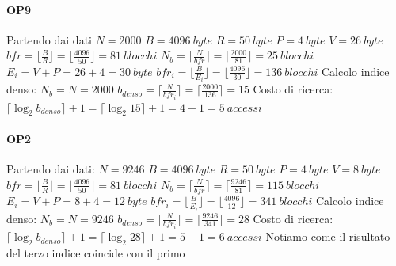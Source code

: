 \paragraph{OP9} Partendo dai dati
\newline
$N = 2000$
\newline
$B = 4096\ byte$
\newline
$R = 50\ byte$
\newline
$P = 4\ byte$
\newline
$V = 26\ byte$
\newline
\newline
$bfr = \lfloor \frac{B}{R} \rfloor = \lfloor \frac{4096}{50} \rfloor = 81 \ blocchi$
\newline
$N_b = \lceil \frac{N}{bfr} \rceil = \lceil \frac{2000}{81} \rceil = 25\ blocchi$
\newline
$E_i = V + P = 26 + 4 = 30\ byte$
\newline
$bfr_i = \lfloor \frac{B}{E_i} \rfloor = \lfloor \frac{4096}{30} \rfloor = 136\ blocchi$
\newline
Calcolo indice denso: 
$N_b = N = 2000$
$b_{denso} = \lceil \frac{N}{bfr_i} \rceil = \lceil \frac{2000}{136} \rceil = 15$
Costo di ricerca: 
$\lceil \log_2{b_{denso}} \rceil + 1 = \lceil \log_2{15} \rceil + 1 = 4 + 1 = 5\ accessi$
\newpage
\paragraph{OP2} Partendo dai dati: 
\newline
$N = 9246$
\newline
$B = 4096\ byte$
\newline
$R = 50\ byte$
\newline
$P = 4\ byte$
\newline
$V = 8\ byte$
\newline
\newline
$bfr = \lfloor \frac{B}{R} \rfloor = \lfloor \frac{4096}{50} \rfloor = 81 \ blocchi$
\newline
$N_b = \lceil \frac{N}{bfr} \rceil = \lceil \frac{9246}{81} \rceil = 115\ blocchi$
\newline
$E_i = V + P = 8 + 4 = 12\ byte$
\newline
$bfr_i = \lfloor \frac{B}{E_i} \rfloor = \lfloor \frac{4096}{12} \rfloor = 341\ blocchi$
\newline
Calcolo indice denso: 
$N_b = N = 9246$
$b_{denso} = \lceil \frac{N}{bfr_i} \rceil = \lceil \frac{9246}{341} \rceil = 28$
Costo di ricerca: 
$\lceil \log_2{b_{denso}} \rceil + 1 = \lceil \log_2{28} \rceil + 1 = 5 + 1 = 6\ accessi$
\newline
\newline
Notiamo come il risultato del terzo indice coincide con il primo